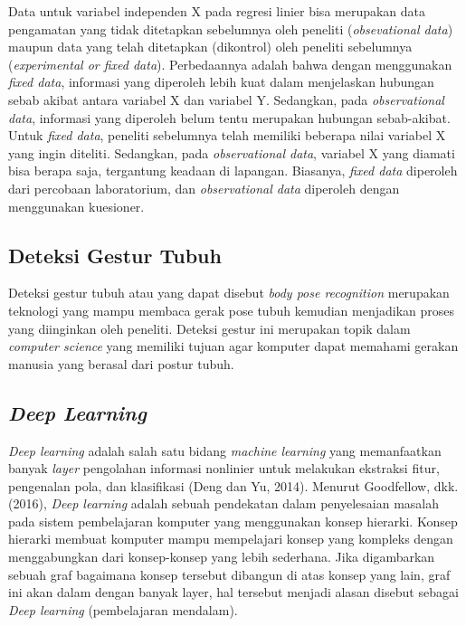 Data untuk variabel independen X pada regresi linier bisa merupakan data pengamatan yang tidak ditetapkan sebelumnya oleh peneliti (\emph{obsevational data}) maupun data yang telah ditetapkan (dikontrol) oleh peneliti sebelumnya (\emph{experimental or fixed data}). Perbedaannya adalah bahwa dengan menggunakan \emph{fixed data}, informasi yang diperoleh lebih kuat dalam menjelaskan hubungan sebab akibat antara variabel X dan variabel Y. Sedangkan, pada \emph{observational data}, informasi yang diperoleh belum tentu merupakan hubungan sebab-akibat. Untuk \emph{fixed data}, peneliti sebelumnya telah memiliki beberapa nilai variabel X yang ingin diteliti. Sedangkan, pada \emph{observational data}, variabel X yang diamati bisa berapa saja, tergantung keadaan di lapangan. Biasanya, \emph{fixed data} diperoleh dari percobaan laboratorium, dan \emph{observational data} diperoleh dengan menggunakan kuesioner.

\subsection{Deteksi Gestur Tubuh}

Deteksi gestur tubuh atau yang dapat disebut \emph{body pose recognition} merupakan teknologi yang mampu membaca gerak pose tubuh kemudian menjadikan proses yang diinginkan oleh peneliti. Deteksi gestur ini merupakan topik dalam \emph{computer science} yang memiliki tujuan agar komputer dapat memahami gerakan manusia yang berasal dari postur tubuh.

\subsection{\emph{Deep Learning}}

\emph{Deep learning} adalah salah satu bidang \emph{machine learning} yang memanfaatkan banyak \emph{layer} pengolahan informasi nonlinier untuk melakukan ekstraksi fitur, pengenalan pola, dan klasifikasi (Deng dan Yu, 2014). Menurut Goodfellow, dkk. (2016), \emph{Deep learning} adalah sebuah pendekatan dalam penyelesaian masalah pada sistem pembelajaran komputer yang menggunakan konsep hierarki. Konsep hierarki membuat komputer mampu mempelajari konsep yang kompleks dengan menggabungkan dari konsep-konsep yang lebih sederhana. Jika digambarkan sebuah graf bagaimana konsep tersebut dibangun di atas konsep yang lain, graf ini akan dalam dengan banyak layer, hal tersebut menjadi alasan disebut sebagai \emph{Deep learning} (pembelajaran mendalam).

